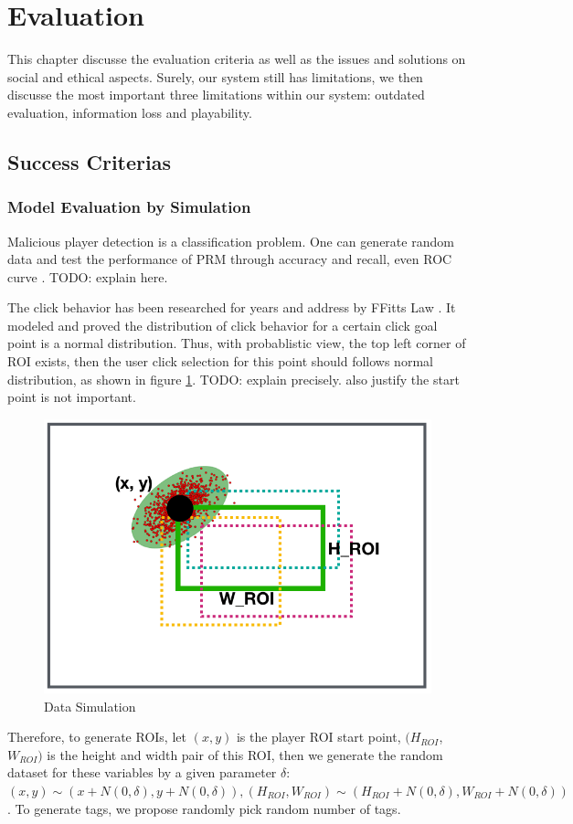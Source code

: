 \section{Evaluation}

This chapter discusse the evaluation criteria as well as the issues and solutions on social and ethical aspects.
Surely, our system still has limitations, we then discusse the most important three limitations within our system: 
outdated evaluation, information loss and playability.

\subsection{Success Criterias}

\subsubsection{Model Evaluation by Simulation}

Malicious player detection is a classification problem. 
One can generate random data and test the performance of PRM through accuracy and recall, even ROC curve \cite{hanley1982meaning}.
TODO: explain here.

The click behavior has been researched for years and address by FFitts Law \cite{bi2013ffitts}.
It modeled and proved the distribution of click behavior for a certain click goal point is a normal distribution.
Thus, with probablistic view, the top left corner of ROI exists, then the user click selection 
for this point should follows normal distribution, as shown in figure \ref{fig:evaluation}.
TODO: explain precisely. also justify the start point is not important.

\begin{figure}[htp]
\centering
\includegraphics[width=0.5\columnwidth]{figures/evaluation}
\caption{Data Simulation}
\label{fig:evaluation}
\end{figure}

Therefore, to generate ROIs, let $(x, y)$ is the player ROI start point,  $(H_{ROI}$, $W_{ROI})$ is the height
and width pair of this ROI, then we generate the random dataset for these variables by a given
parameter $\delta$: $(x, y) \sim (x+N(0, \delta), y+N(0, \delta)), (H_{ROI}, W_{ROI}) \sim (H_{ROI}+N(0, \delta), W_{ROI}+N(0, \delta))$.
To generate tags, we propose randomly pick random number of tags.

